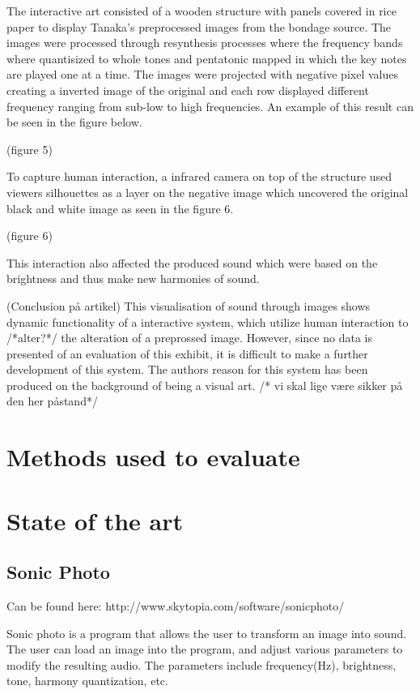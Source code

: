 The interactive art consisted of a wooden structure with panels covered in rice paper to display Tanaka's preprocessed images from the bondage source. The images were processed through resynthesis processes where the frequency bands where quantisized to whole tones and pentatonic mapped in which the key notes are played one at a time. The images were projected with negative pixel values creating a inverted image of the original and each row displayed different frequency ranging from sub-low to high frequencies. An example of this result can be seen in the figure below. 

(figure 5)

To capture human interaction, a infrared camera on top of the structure used viewers silhouettes as a layer on the negative image which uncovered the original black and white image as seen in the figure 6.

(figure 6)

This interaction also affected the produced sound which were based on the brightness and thus make new harmonies of sound. 

(Conclusion på artikel)
This visualisation of sound through images shows dynamic functionality of a interactive system, which utilize human interaction to /*alter?*/ the alteration of a preprossed image. However, since no data is presented of an evaluation of this exhibit, it is difficult to make a further development of this system. The authors reason for this system has been produced on the background of being a visual art. /* vi skal lige være sikker på den her påstand*/   
 

\section{Methods used to evaluate}\label{sub:methodsusedtoevaluate}






\section{State of the art}\label{sec:stateart}

\subsection{Sonic Photo}\label{sub:sonic}
Can be found here: http://www.skytopia.com/software/sonicphoto/

Sonic photo is a program that allows the user to transform an image into sound. The user can load an image into the program, and adjust various parameters to modify the resulting audio. The parameters include  frequency(Hz), brightness, tone, harmony quantization, etc.

